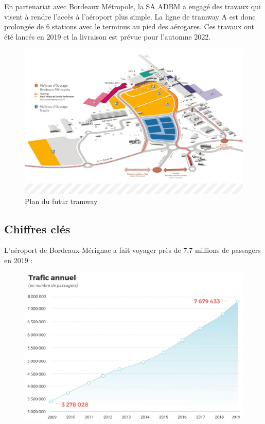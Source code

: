 En partenariat avec Bordeaux Métropole, la SA ADBM a engagé des travaux qui visent à rendre l'accès à l'aéroport plus simple. La ligne de tramway A est donc prolongée de 6 stations avec le terminus au pied des aérogares. Ces travaux ont été lancés en 2019 et la livraison est prévue pour l'automne 2022.\newline

\begin{figure}[hbt!]
    \centering
    \includegraphics[width=16cm]{Images/tramway.jpg}
    \caption{Plan du futur tramway}
    \label{fig:futurtram}
\end{figure}

\newpage

\subsection{Chiffres clés}

L'aéroport de Bordeaux-Mérignac a fait voyager près de 7,7 millions de passagers en 2019 :

\begin{figure}[hbt!]
    \centering
    \includegraphics[width=12cm]{Images/trafic.jpg}
    \label{fig:trafic}
\end{figure}


